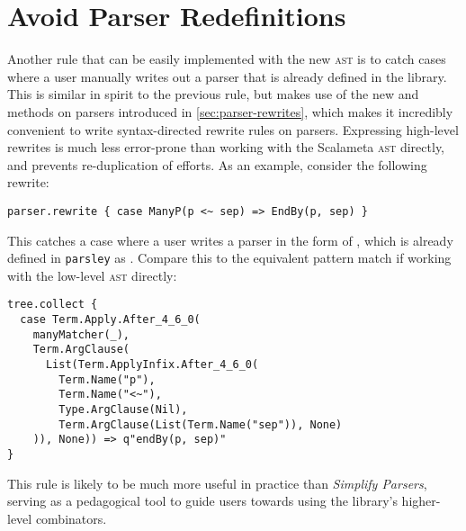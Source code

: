 \documentclass[../../main.tex]{subfiles}
\begin{document}
\section{Avoid Parser Redefinitions}\label{sec:avoid-redefinitions-rule}
Another rule that can be easily implemented with the new  \textsc{ast} is to catch cases where a user manually writes out a parser that is already defined in the library.
This is similar in spirit to the previous rule, but makes use of the new  and  methods on parsers introduced in \cref{sec:parser-rewrites}, which makes it incredibly convenient to write syntax-directed rewrite rules on parsers.
Expressing high-level rewrites is much less error-prone than working with the Scalameta \textsc{ast} directly, and prevents re-duplication of efforts.
As an example, consider the following rewrite:
\begin{verbatim}
parser.rewrite { case ManyP(p <~ sep) => EndBy(p, sep) }
\end{verbatim}
%
This catches a case where a user writes a parser in the form of , which is already defined in \texttt{parsley} as .
Compare this to the equivalent pattern match if working with the low-level \textsc{ast} directly:
\begin{verbatim}
tree.collect {
  case Term.Apply.After_4_6_0(
    manyMatcher(_),
    Term.ArgClause(
      List(Term.ApplyInfix.After_4_6_0(
        Term.Name("p"),
        Term.Name("<~"),
        Type.ArgClause(Nil),
        Term.ArgClause(List(Term.Name("sep")), None)
    )), None)) => q"endBy(p, sep)"
}
\end{verbatim}
%
This rule is likely to be much more useful in practice than \emph{Simplify Parsers}, serving as a pedagogical tool to guide users towards using the library's higher-level combinators.


\end{document}
